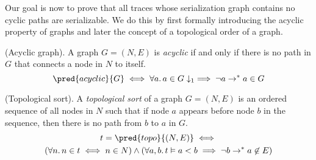 Our goal is now to prove that all traces whose serialization graph contains no cyclic paths are serializable. We do this by first formally introducing the acyclic property of graphs and later the concept of a topological order of a graph.

\begin{defn}
	(Acyclic graph).
	A graph $G = (N, E)$ is \emph{acyclic} if and only if there is no path in $G$ that connects a node in $N$ to itself.
	\[
		\pred{acyclic}{G} \iff \forall a \ldotp a \in G \downarrow_1 \implies \lnot a \rightarrow^* a \in G
	\]
\end{defn}

\begin{defn}
	(Topological sort).
	A \emph{topological sort} of a graph $G = (N, E)$ is an ordered sequence of all nodes in $N$ such that if node $a$ appears before node $b$ in the sequence, then there is no path from $b$ to $a$ in $G$.
	\begin{gather*}
		t = \pred{topo}{(N, E)} \iff \\
		(\forall n \ldotp n \in t \iff n \in N) \land (\forall a, b \ldotp t \vDash a < b \implies \lnot b \rightarrow^* a \not\in E)
	\end{gather*}
\end{defn}

